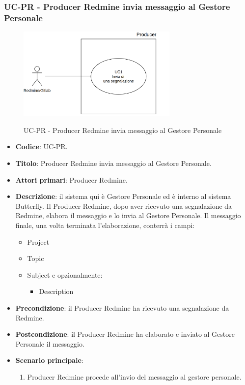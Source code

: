 \subsubsection{UC\theuccount-PR - Producer Redmine invia messaggio al Gestore Personale}
    \begin{figure}[H]
		\centering
		\includegraphics[width=0.7\textwidth]{img/UC1.png}\\
		\caption{UC\theuccount-PR - Producer Redmine invia messaggio al Gestore Personale}
	\end{figure}
	\begin{itemize}
		\item \textbf{Codice}: UC\theuccount-PR.
		\item \textbf{Titolo}: Producer Redmine invia messaggio al Gestore Personale.
		\item \textbf{Attori primari}: Producer Redmine.
		\item \textbf{Descrizione}: il sistema qui è Gestore Personale ed è interno al sistema
		 Butterfly. Il Producer Redmine, dopo aver ricevuto una
		 segnalazione da Redmine, elabora il messaggio e lo invia al Gestore Personale.
		 Il messaggio finale, una volta terminata l'elaborazione, conterrà i campi:
		 \begin{itemize}
		 	\item Project
		 	\item Topic
		 	\item Subject e opzionalmente:
		 	\begin{itemize}
		 		\item Description
		 	\end{itemize}
		 \end{itemize}
		\item \textbf{Precondizione}: il Producer Redmine ha ricevuto una segnalazione da Redmine.
		\item \textbf{Postcondizione}: il Producer Redmine ha elaborato e inviato al Gestore Personale il messaggio.
		\item \textbf{Scenario principale}: 
		\begin{enumerate}
			\item Producer Redmine procede all'invio del messaggio al gestore personale.
		\end{enumerate}
		
	\end{itemize}
	
